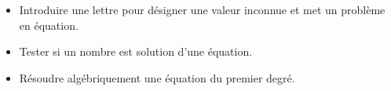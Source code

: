 \begin{changemargin}{-5mm}{-15mm}
\begin{prerequis}[Objectifs de 4\up{e}]    
    \begin{itemize}        
        \item Introduire une lettre pour désigner une valeur inconnue et met un problème en équation.
        \item Tester si un nombre est solution d’une équation.
        \item Résoudre algébriquement une équation du premier degré.
    \end{itemize}
\end{prerequis}
\end{changemargin}
